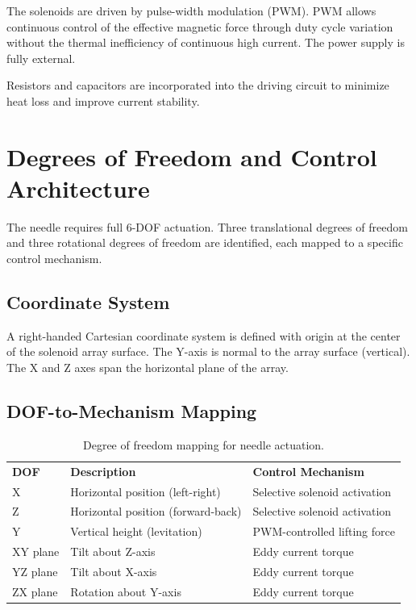 \documentclass[10pt]{article}
\begin{document}
The solenoids are driven by pulse-width modulation (PWM). PWM allows continuous control of the effective magnetic force through duty cycle variation without the thermal inefficiency of continuous high current. The power supply is fully external.

Resistors and capacitors are incorporated into the driving circuit to minimize heat loss and improve current stability.

\section{Degrees of Freedom and Control Architecture}
The needle requires full 6-DOF actuation. Three translational degrees of freedom and three rotational degrees of freedom are identified, each mapped to a specific control mechanism.

\subsection{Coordinate System}
A right-handed Cartesian coordinate system is defined with origin at the center of the solenoid array surface. The Y-axis is normal to the array surface (vertical). The X and Z axes span the horizontal plane of the array.

\subsection{DOF-to-Mechanism Mapping}
\begin{table}[htbp]
\centering
\begin{tabularx}{\linewidth}{l X X}
\textbf{DOF} & \textbf{Description} & \textbf{Control Mechanism} \\
X & Horizontal position (left-right) & Selective solenoid activation \\
Z & Horizontal position (forward-back) & Selective solenoid activation \\
Y & Vertical height (levitation) & PWM-controlled lifting force \\
XY plane & Tilt about Z-axis & Eddy current torque \\
YZ plane & Tilt about X-axis & Eddy current torque \\
ZX plane & Rotation about Y-axis & Eddy current torque \\
\end{tabularx}
\caption{Degree of freedom mapping for needle actuation.}
\end{table}
\end{document}

